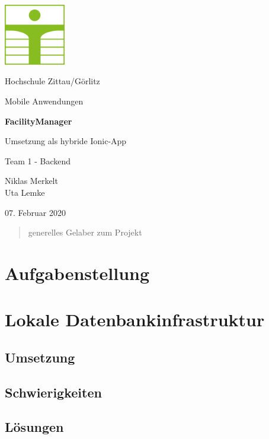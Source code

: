 \documentclass[12pt]{article}
\begin{document}
\begin{titlepage}
	\centering
	\includegraphics[width=0.2\textwidth]{Bilder/hszg}\par
	\vspace{1cm}
	{\LARGE Hochschule Zittau/Görlitz \par}
	\vspace{1cm}
	{\Large Mobile Anwendungen\par}
	\vspace{1.5cm}
	{\huge\bfseries FacilityManager \par}
	\vspace{0.75cm}
	{\LARGE Umsetzung als hybride Ionic-App\par}
	\vspace{2cm}
	{\Large Team 1 - Backend\par}
	\vspace{0.75cm}
	{\Large Niklas Merkelt\\Uta Lemke\par}
	\vfill
	{\large 07. Februar 2020\par}
\end{titlepage}

\tableofcontents
\newpage

\begin{abstract}
generelles Gelaber zum Projekt
\end{abstract}

\section{Aufgabenstellung}

\section{Lokale Datenbankinfrastruktur}
\subsection{Umsetzung}
\subsection{Schwierigkeiten}
\subsection{Lösungen}
\end{document}
